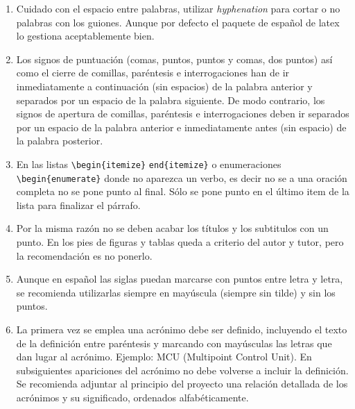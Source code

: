 \begin{enumerate}
    \item Cuidado con el espacio entre palabras, utilizar \emph{hyphenation} para cortar o no palabras con los guiones. Aunque por defecto el paquete de español de latex lo gestiona aceptablemente bien.

\item Los signos de puntuación (comas, puntos, puntos y comas, dos puntos) así   como   el   cierre  de   comillas, paréntesis e   interrogaciones han   de   ir inmediatamente   a   continuación   (sin   espacios)   de   la   palabra   anterior   y separados  por  un  espacio  de  la  palabra siguiente.  De  modo  contrario,  los signos   de   apertura   de   comillas, paréntesis e   interrogaciones deben   ir separados  por  un  espacio  de  la  palabra  anterior e inmediatamente  antes  (sin espacio) de la palabra posterior.


\item En las listas \lstinline[language=enparrafo]!\begin{itemize}! \lstinline[language=enparrafo]!end{itemize}! o enumeraciones \lstinline[language=enparrafo]!\begin{enumerate}! donde no aparezca un verbo, es decir no se a una oración completa no se pone punto al final. Sólo se pone punto en el último item de la lista para finalizar el párrafo.

\item Por la misma razón no se deben acabar los títulos y los subtitulos con un punto. En los pies de figuras y tablas queda a criterio del autor y tutor, pero la recomendación es no ponerlo.

\item Aunque en español las siglas puedan marcarse con puntos entre letra y letra,  se  recomienda  utilizarlas  siempre  en  mayúscula  (siempre  sin  tilde) y  sin los    puntos.  

\item La  primera  vez  se emplea una acrónimo debe  ser  definido, incluyendo   el   texto   de   la   definición   entre   paréntesis   y   marcando   con mayúsculas  las  letras  que  dan  lugar  al  acrónimo.  Ejemplo:  MCU  (Multipoint Control  Unit).  En  subsiguientes  apariciones  del  acrónimo  no  debe  volverse  a incluir  la  definición.  Se  recomienda  adjuntar  al  principio  del  proyecto  una relación    detallada    de    los    acrónimos    y    su    significado,    ordenados alfabéticamente.



\end{enumerate}
